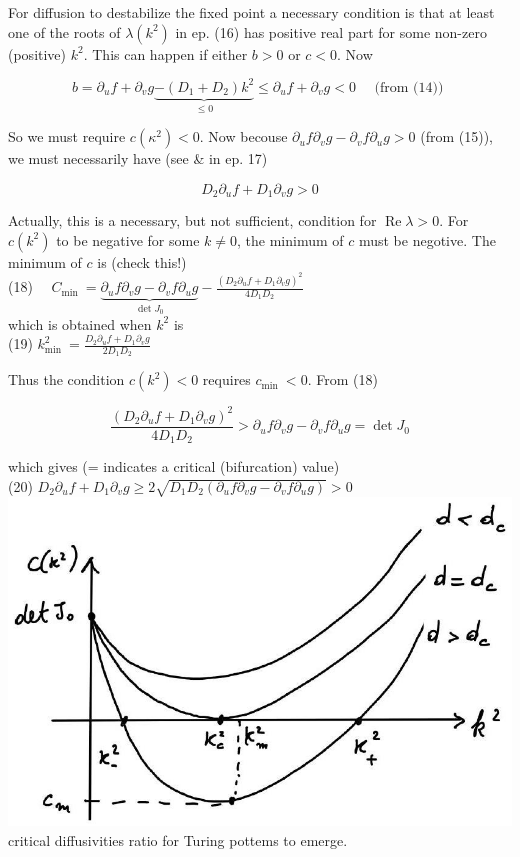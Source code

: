 \documentclass[10pt]{article}
\begin{document}
For diffusion to destabilize the fixed point a necessary condition is that at least one of the roots of $\lambda\left(k^{2}\right)$ in ep. (16) has positive real part for some non-zero (positive) $k^{2}$. This can happen if either $b>0$ or $c<0$. Now

$$
b=\partial_{u} f+\partial_{v} g \underbrace{-\left(D_{1}+D_{2}\right) k^{2}}_{\leqslant 0} \leqslant \partial_{u} f+\partial_{v} g<0 \quad \text { (from (14)) }
$$

So we must require $c\left(\kappa^{2}\right)<0$. Now becouse $\partial_{u} f \partial_{v} g-\partial_{v} f \partial_{u} g>0$ (from (15)), we must necessarily have (see \& in ep. 17)

$$
D_{2} \partial_{u} f+D_{1} \partial_{v} g>0
$$

Actually, this is a necessary, but not sufficient, condition for $\operatorname{Re} \lambda>0$. For $c\left(k^{2}\right)$ to be negative for some $k \neq 0$, the minimum of $c$ must be negotive. The minimum of $c$ is (check this!)\\
(18) $\quad C_{\text {min }}=\underbrace{\partial_{u} f \partial_{v} g-\partial_{v} f \partial_{u} g}_{\operatorname{det} J_{0}}-\frac{\left(D_{2} \partial_{u} f+D_{1} \partial_{v} g\right)^{2}}{4 D_{1} D_{2}}$\\
which is obtained when $k^{2}$ is\\
(19) $k_{\text {min }}^{2}=\frac{D_{2} \partial_{u} f+D_{1} \partial_{v} g}{2 D_{1} D_{2}}$

Thus the condition $c\left(k^{2}\right)<0$ requires $c_{\text {min }}<0$. From (18)

$$
\frac{\left(D_{2} \partial_{u} f+D_{1} \partial_{v} g\right)^{2}}{4 D_{1} D_{2}}>\partial_{u} f \partial_{v} g-\partial_{v} f \partial_{u} g=\operatorname{det} J_{0}
$$

which gives (= indicates a critical (bifurcation) value)\\
(20) $D_{2} \partial_{u} f+D_{1} \partial_{v} g \geqslant 2 \sqrt{D_{1} D_{2}\left(\partial_{u} f \partial_{v} g-\partial_{v} f \partial_{u} g\right)}>0$\\
\includegraphics[max width=\textwidth, center]{2025_10_17_3cf351a4349ae3691080g-09}\\
critical diffusivities ratio for Turing pottems to emerge.
\end{document}
